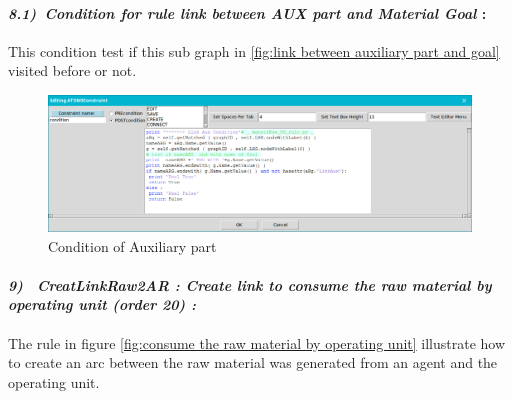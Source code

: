 \paragraph{\emph{8.1)~Condition for rule link between AUX part and Material Goal } : }
This condition test if this sub graph in \ref{fig:link between auxiliary part and goal} visited before or not.
 
\vspace{1cm}
 
\begin{figure}[th]
	\centering
 	\includegraphics[scale=0.37]{ch3/img/condaux}
	\caption{\label{fig:Condition of Auxiliary part}Condition of Auxiliary part }
\end{figure} 


\paragraph{\emph{9)~ CreatLinkRaw2AR : Create link to consume the raw material by operating unit (order 20) :} }
 
 
The rule in figure \ref{fig:consume the raw material by operating unit} illustrate how to create an arc between 
the raw material was generated from an agent and the operating unit.


